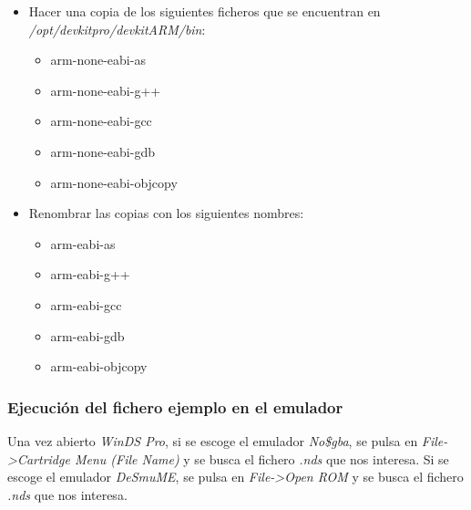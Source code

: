 \begin{itemize}
\item Hacer una copia de los siguientes ficheros que se encuentran en \textit{/opt/devkitpro/devkitARM/bin}:	
 \begin{itemize}
 	\item arm-none-eabi-as
 	\item arm-none-eabi-g++
 	\item arm-none-eabi-gcc	
 	\item arm-none-eabi-gdb
   \item arm-none-eabi-objcopy
 \end{itemize}
 	\item Renombrar las copias con los siguientes nombres:	
 \begin{itemize}
 	\item arm-eabi-as
 	\item arm-eabi-g++
 	\item arm-eabi-gcc	
 	\item arm-eabi-gdb
   \item arm-eabi-objcopy
 \end{itemize}
\end{itemize}

\subsubsection{Ejecución del fichero ejemplo en el emulador}
Una vez abierto \textit{WinDS Pro}, si se escoge el emulador \textit{No\$gba}, se pulsa en \textit{File->Cartridge Menu (File Name)} y se busca el fichero \textit{.nds} que nos interesa. Si se escoge el emulador \textit{DeSmuME}, se pulsa en \textit{File->Open ROM} y se busca el fichero \textit{.nds} que nos interesa.

